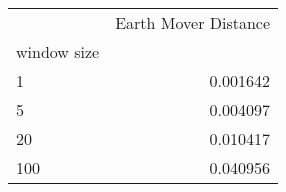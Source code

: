 \begin{tabular}{lr}
\toprule
{} &  Earth Mover Distance \\
window size &                       \\
\midrule
1           &              0.001642 \\
5           &              0.004097 \\
20          &              0.010417 \\
100         &              0.040956 \\
\bottomrule
\end{tabular}
